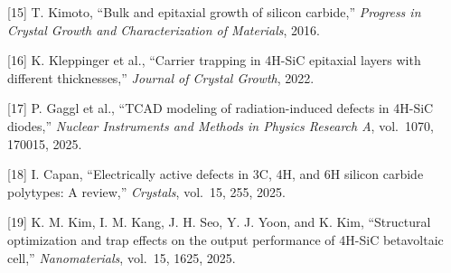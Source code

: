 \documentclass[
  10pt,
  a4paper,
]{ctexart}
\begin{document}
{[}15{]} T. Kimoto, ``Bulk and epitaxial growth of silicon carbide,''
\emph{Progress in Crystal Growth and Characterization of Materials},
2016.

{[}16{]} K. Kleppinger et al., ``Carrier trapping in 4H-SiC epitaxial
layers with different thicknesses,'' \emph{Journal of Crystal Growth},
2022.

{[}17{]} P. Gaggl et al., ``TCAD modeling of radiation-induced defects
in 4H-SiC diodes,'' \emph{Nuclear Instruments and Methods in Physics
Research A}, vol.~1070, 170015, 2025.

{[}18{]} I. Capan, ``Electrically active defects in 3C, 4H, and 6H
silicon carbide polytypes: A review,'' \emph{Crystals}, vol.~15, 255,
2025.

{[}19{]} K. M. Kim, I. M. Kang, J. H. Seo, Y. J. Yoon, and K. Kim,
``Structural optimization and trap effects on the output performance of
4H-SiC betavoltaic cell,'' \emph{Nanomaterials}, vol.~15, 1625, 2025.
\end{document}
